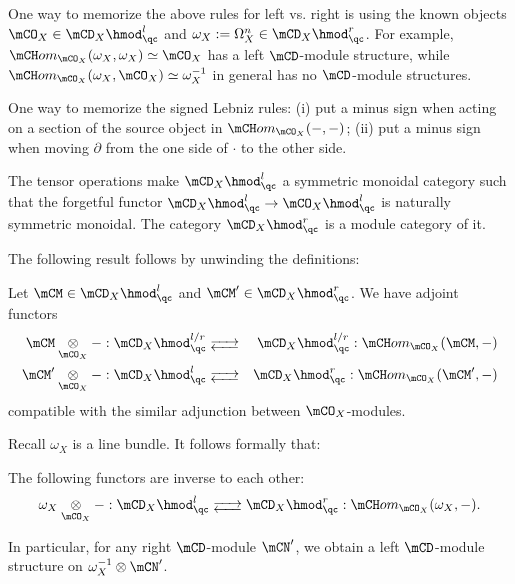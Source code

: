	\begin{rem}
		One way to memorize the above rules for left vs. right is using the known objects $\mCO_X \in \mCD_X\hmod_\qc^l$ and $\omega_X:=\Omega_X^n \in \mCD_X\hmod_\qc^r$. For example, $\mCH om_{\mCO_X}(\omega_X,\omega_X)\simeq \mCO_X$ has a left $\mCD$-module structure, while $\mCH om_{\mCO_X}(\omega_X,\mCO_X)\simeq \omega_X^{-1}$ in general has no $\mCD$-module structures.
	\end{rem}

	\begin{rem}
		One way to memorize the signed Lebniz rules: (i) put a minus sign when acting on a section of the source object in $\mCH om_{\mCO_X}(-,-)$; (ii) put a minus sign when moving $\partial$ from the one side of $\cdot$ to the other side.
	\end{rem}

	\begin{rem}
		The tensor operations make $\mCD_X\hmod_\qc^l$ a symmetric monoidal category such that the forgetful functor $\mCD_X\hmod_\qc^l \to \mCO_X\hmod_\qc^l$ is naturally symmetric monoidal. The category $\mCD_X\hmod_\qc^r$ is a module category of it.
	\end{rem}

	The following result follows by unwinding the definitions:

	\begin{lem}
		Let $\mCM\in \mCD_X\hmod_\qc^l$ and  $\mCM' \in \mCD_X\hmod_\qc^r$. We have adjoint functors
		\begin{eqnarray*}
			\mCM \ot_{\mCO_X} - : \mCD_X\hmod_\qc^{l/r} &\adj& \mCD_X\hmod_\qc^{l/r} : \mCH om_{\mCO_X}(\mCM,-) \\
			\mCM' \ot_{\mCO_X} - : \mCD_X\hmod_\qc^{l} &\adj& \mCD_X\hmod_\qc^{r} : \mCH om_{\mCO_X}(\mCM',-)
		\end{eqnarray*}
		compatible with the similar adjunction between $\mCO_X$-modules.
	\end{lem}

	Recall $\omega_X$ is a line bundle. It follows formally that:

	\begin{cor}
		The following functors are inverse to each other:
		\[
			\omega_X \ot_{\mCO_X} - : \mCD_X\hmod_\qc^{l} \adj \mCD_X\hmod_\qc^{r} : \mCH om_{\mCO_X}(\omega_X,-).
		\]
	\end{cor}

	\begin{rem}
		In particular, for any right $\mCD$-module $\mCN'$, we obtain a left $\mCD$-module structure on $\omega_X^{-1} \ot \mCN'$.
	\end{rem}


